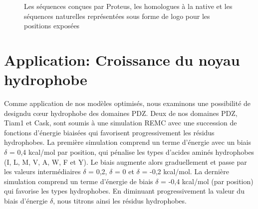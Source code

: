    \begin{figure}[!htbp]
     \caption{Les séquences conçues par Proteus, les homologues à la native et les séquences naturelles représentées sous forme de logo pour les positions exposées}
\label{logo:fullcutPDZ}
   \end{figure}
    
\section{Application: Croissance du noyau hydrophobe}
Comme application de nos modèles optimisés, nous examinons une possibilité de \og design\fg du cœur hydrophobe des domaines PDZ. Deux de nos domaines PDZ, Tiam1 et Cask, sont soumis à une simulation REMC avec une succession de fonctions d'énergie biaisées qui favorisent progressivement les résidus hydrophobes. La première simulation comprend un terme d'énergie avec un biais $\delta$ = 0,4 kcal/mol par position, qui pénalise les types d'acides aminés hydrophobes (I, L, M, V, A, W, F et Y). Le biais augmente alors graduellement et passe par les valeurs intermédiaires $\delta$ = 0,2, $\delta$ = 0 et $\delta$ = -0,2 kcal/mol. La dernière simulation comprend un terme d'énergie de biais $\delta$ = -0,4 kcal/mol (par position) qui favorise les types hydrophobes. En diminuant progressivement la valeur du biais d'énergie $\delta$, nous \og titrons \fg ainsi les résidus hydrophobes.


